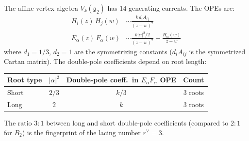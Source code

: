 \begin{computation}\label{comp:G2-ope}
The affine vertex algebra $V_k(\mathfrak{g}_2)$ has $14$ generating
currents. The OPEs are:
\begin{align}
H_i(z)\, H_j(w) &\sim \frac{k\, d_i A_{ij}}{(z-w)^2}
 \label{eq:G2-HH} \\
E_\alpha(z)\, F_\alpha(w) &\sim
 \frac{k |\alpha|^2/2}{(z-w)^2}
 + \frac{H_\alpha(w)}{z-w}
 \label{eq:G2-EF}
\end{align}
where $d_1 = 1/3$, $d_2 = 1$ are the symmetrizing constants
($d_i A_{ij}$ is the symmetrized Cartan matrix).
The double-pole coefficients depend on root length:
\begin{center}
\renewcommand{\arraystretch}{1.2}
\begin{tabular}{lccc}
\textbf{Root type} & \textbf{$|\alpha|^2$} &
\textbf{Double-pole coeff.\ in $E_\alpha F_\alpha$ OPE} &
\textbf{Count} \\
\hline
Short & $2/3$ & $k/3$ & $3$ roots \\
Long & $2$ & $k$ & $3$ roots
\end{tabular}
\end{center}
The ratio $3:1$ between long and short double-pole coefficients
(compared to $2:1$ for $B_2$) is the fingerprint of the
lacing number $r^\vee = 3$.
\end{computation}

